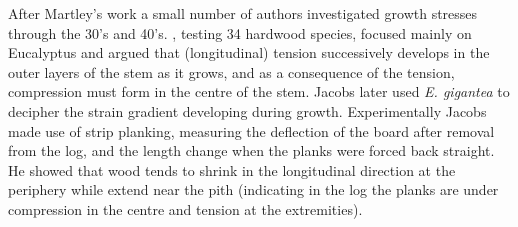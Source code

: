 After Martley's work a small number of authors investigated growth stresses
through the 30's and 40's. \cite{jacobs1945l}, testing 34 hardwood species, focused
mainly on Eucalyptus and argued that (longitudinal) tension successively
develops in the outer layers of the stem as it grows, and as a consequence of
the tension, compression must form in the centre of the stem. Jacobs later used
\textit{E. gigantea} to decipher the strain gradient developing during growth.
Experimentally Jacobs made use of strip planking, measuring the deflection of
the board after removal from the log, and the length change when the planks were
forced back straight. He showed that wood tends to shrink in the longitudinal
direction at the periphery while extend near the pith (indicating in the log
the planks are under compression in the centre and tension at the extremities).